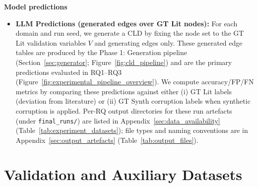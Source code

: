 \noindent\textbf{Model predictions}
\begin{itemize}[noitemsep]
    \item \textbf{LLM Predictions (generated edges over GT Lit nodes):} For each domain and run seed, we generate a CLD by fixing the node set to the GT Lit validation variables \(V\) and generating edges only. These generated edge tables are produced by the Phase 1: Generation pipeline (Section~\ref{sec:generator}; Figure~\ref{fig:cld_pipeline}) and are the primary predictions evaluated in RQ1--RQ3 (Figure~\ref{fig:experimental_pipeline_overview}). We compute accuracy/FP/FN metrics by comparing these predictions against either (i) GT Lit labels (deviation from literature) or (ii) GT Synth corruption labels when synthetic corruption is applied. Per-RQ output directories for these run artefacts (under \texttt{final\_runs/}) are listed in Appendix~\ref{sec:data_availability} (Table~\ref{tab:experiment_datasets}); file types and naming conventions are in Appendix~\ref{sec:output_artefacts} (Table~\ref{tab:output_files}).
\end{itemize}

\section{Validation and Auxiliary Datasets}
\label{sec:aux_datasets}

